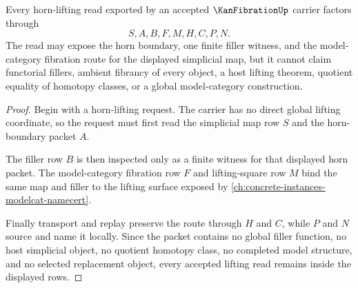 \begin{theorem}
\label{thm:kan-fibration-horn-lifting-scope}
Every horn-lifting read exported by an accepted $\KanFibrationUp$ carrier factors through
$$
S,A,B,F,M,H,C,P,N.
$$
The read may expose the horn boundary, one finite filler witness, and the model-category fibration route for the displayed simplicial map, but it cannot claim functorial fillers, ambient fibrancy of every object, a host lifting theorem, quotient equality of homotopy classes, or a global model-category construction.
\end{theorem}
\begin{proof}
Begin with a horn-lifting request. The carrier has no direct global lifting coordinate, so the request must first read the simplicial map row $S$ and the horn-boundary packet $A$.

The filler row $B$ is then inspected only as a finite witness for that displayed horn packet. The model-category fibration row $F$ and lifting-square row $M$ bind the same map and filler to the lifting surface exposed by \autoref{ch:concrete-instances-modelcat-namecert}.

Finally transport and replay preserve the route through $H$ and $C$, while $P$ and $N$ source and name it locally. Since the packet contains no global filler function, no host simplicial object, no quotient homotopy class, no completed model structure, and no selected replacement object, every accepted lifting read remains inside the displayed rows.
\end{proof}




